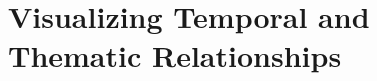 \chapter{Visualizing Temporal and Thematic Relationships}

\graphicspath{{Chapter4/figures/}}
%
%
%
%
%
%
